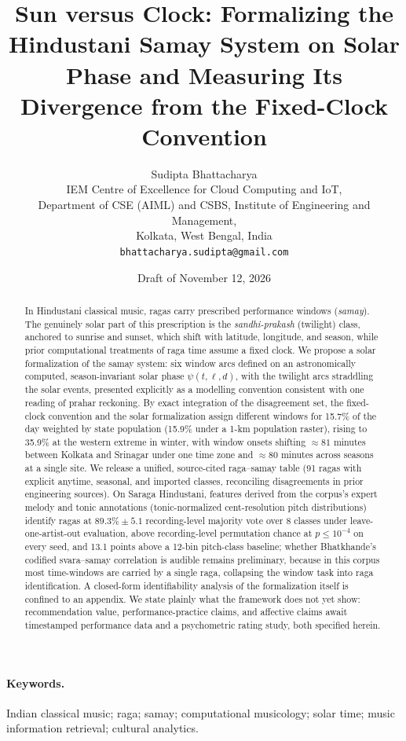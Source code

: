 \documentclass[11pt]{article}
\title{Sun versus Clock: Formalizing the Hindustani Samay System on Solar
Phase and Measuring Its Divergence from the Fixed-Clock Convention}
\author{Sudipta Bhattacharya\\[2pt]
\small IEM Centre of Excellence for Cloud Computing and IoT,\\
\small Department of CSE (AIML) and CSBS, Institute of Engineering and Management,\\
\small Kolkata, West Bengal, India\\
\small \texttt{bhattacharya.sudipta@gmail.com}}
\date{Draft of November 12, 2026}
\begin{document}
\maketitle

\begin{abstract}
In Hindustani classical music, ragas carry prescribed performance windows
(\emph{samay}). The genuinely solar part of this prescription is the
\emph{sandhi-prakash} (twilight) class, anchored to sunrise and sunset, which
shift with latitude, longitude, and season, while prior computational
treatments of raga time assume a fixed clock. We propose a solar
formalization of the samay system: six window arcs defined on an
astronomically computed, season-invariant solar phase $\psi(t,\ell,d)$, with
the twilight arcs straddling the solar events, presented explicitly as a
modelling convention consistent with one reading of prahar reckoning. By
exact integration of the disagreement set, the fixed-clock convention and the
solar formalization assign different windows for 15.7\% of the day weighted
by state population (15.9\% under a 1-km population raster), rising to 35.9\%
at the western extreme in winter, with window onsets shifting
${\approx}81$ minutes between Kolkata and Srinagar under one time zone and
${\approx}80$ minutes across seasons at a single site. We release a unified,
source-cited raga--samay table (91 ragas with explicit anytime, seasonal, and
imported classes, reconciling disagreements in prior engineering sources).
On Saraga Hindustani, features derived from the corpus's expert melody and
tonic annotations (tonic-normalized cent-resolution pitch distributions)
identify ragas at $89.3\% \pm 5.1$ recording-level majority vote over 8
classes under leave-one-artist-out evaluation, above recording-level
permutation chance at $p \le 10^{-4}$ on every seed, and 13.1 points above a
12-bin pitch-class baseline; whether Bhatkhande's codified svara--samay
correlation is audible remains preliminary, because in this corpus most
time-windows are carried by a single raga, collapsing the window task into
raga identification. A closed-form identifiability analysis of the
formalization itself is confined to an appendix. We state plainly what the
framework does not yet show: recommendation value, performance-practice
claims, and affective claims await timestamped performance data and a
psychometric rating study, both specified herein.
\end{abstract}

\paragraph{Keywords.} Indian classical music; raga; samay; computational
musicology; solar time; music information retrieval; cultural analytics.
\end{document}
